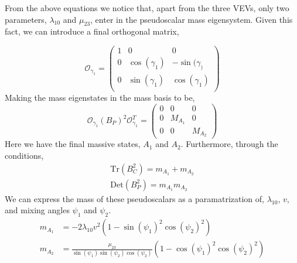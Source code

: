 %
From the above equations we notice that, apart from the three VEVs, only two parameters, $\lambda_{10}$ and $\mu_{23}$, enter in the pseudoscalar mass eigensystem. Given this fact, we can introduce a final orthogonal matrix,
%
\begin{comment}
From here we can use the relations, 
\begin{equation}
\mathrm{Tr} ( B_P^2 ) = m_{A_1} + m_{A_2}\quad , \quad  \mathrm{Det}( B_P^2 ) =  m_{A_1}  m_{A_2}
\end{equation}
to reach the mass for the two pseudo scalars as, 

{ \color{red} ?}
\end{comment} 
%
%
\begin{equation}
\mathcal{O}_{\gamma_1} = \begin{pmatrix}
1 & 0 & 0 \\
0 & \cos(\gamma_1) & -\sin(\gamma_) \\ 
0 & \sin(\gamma_1) & \cos(\gamma_1) \\
\end{pmatrix}
\end{equation}
Making the mass eigenstates in the mass basis to be, 
\begin{equation}
\mathcal{O}_{\gamma_1} \left( B_P \right)^2 \mathcal{O}_{\gamma_1}^T   = \begin{pmatrix}
0 & 0 & 0 \\ 
0 & M_{A_1} & 0 \\ 
0 & 0 & M_{A_2}
\end{pmatrix} 
\end{equation}
Here we have the final massive states,  $A_1$ and $A_2$. Furthermore, through the conditions, 
\begin{equation}
\begin{gathered}
\mathrm{Tr}(B_C^2) = m_{A_1} + m_{A_2}  \\
\mathrm{Det}( B_P^2 ) =  m_{A_1}  m_{A_2}
\end{gathered}
\end{equation} 
We can express the mass of these pseudoscalars as a paramatrization of, $\lambda_10$, $v$, and mixing angles $\psi_1$ and $\psi_2$. 
\begin{equation}
\begin{split}
m_{A_1} & = - 2 \lambda_{10} v^2 \left( 1 - \sin(\psi_1)^2 \cos(\psi_2)^2 \right) \\ 
m_{A_2} & = \frac{\mu_23}{\sin(\psi_1)\sin(\psi_2)\cos(\psi_2)} \left( 1 - \cos(\psi_1)^2 \cos(\psi_2)^2 \right)
\end{split} 
\end{equation} 

